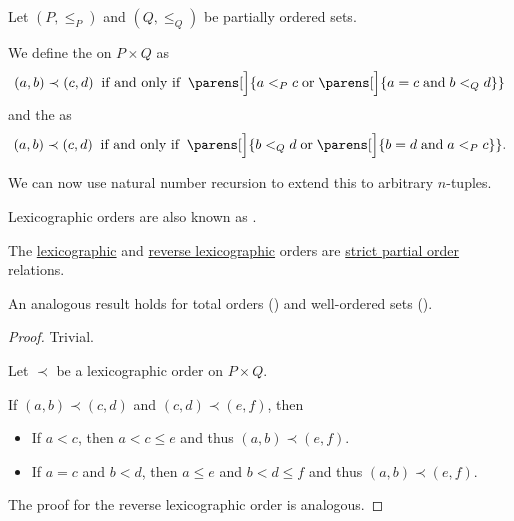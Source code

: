 \begin{definition}\label{def:lexicographic_order}
  Let \( (P, \leq_P) \) and \( (Q, \leq_Q) \) be partially ordered sets.

  We define the  on \( P \times Q \) as
  \begin{equation}\label{eq:def:lexicographic_order}
    (a, b) \prec (c, d) \thickspace \T{if and only if} \thickspace \parens[\Big]{ a <_P c \T{or} \parens[\Big]{ a = c \T{and} b <_Q d } }
  \end{equation}
  and the  as
  \begin{equation}\label{eq:def:lexicographic_order/reverse}
    (a, b) \prec (c, d) \thickspace \T{if and only if} \thickspace \parens[\Big]{ b <_Q d \T{or} \parens[\Big]{ b = d \T{and} a <_P c } }.
  \end{equation}

  We can now use natural number recursion to extend this to arbitrary \( n \)-tuples.
\end{definition}
\begin{comments}
  \item Lexicographic orders are also known as .
\end{comments}

\begin{proposition}\label{thm:lexicographic_order_is_partial_order}
  The \hyperref[eq:def:lexicographic_order]{lexicographic} and \hyperref[eq:def:lexicographic_order/reverse]{reverse lexicographic} orders are \hyperref[def:partially_ordered_set]{strict partial order} relations.
\end{proposition}
\begin{comments}
  \item An analogous result holds for total orders () and well-ordered sets ().
\end{comments}
\begin{proof}
   Trivial.

   Let \( \prec \) be a lexicographic order on \( P \times Q \).

  If \( (a, b) \prec (c, d) \) and \( (c, d) \prec (e, f) \), then
  \begin{itemize}
    \item If \( a < c \), then \( a < c \leq e \) and thus \( (a, b) \prec (e, f) \).

    \item If \( a = c \) and \( b < d \), then \( a \leq e \) and \( b < d \leq f \) and thus \( (a, b) \prec (e, f) \).
  \end{itemize}

   The proof for the reverse lexicographic order is analogous.
\end{proof}

